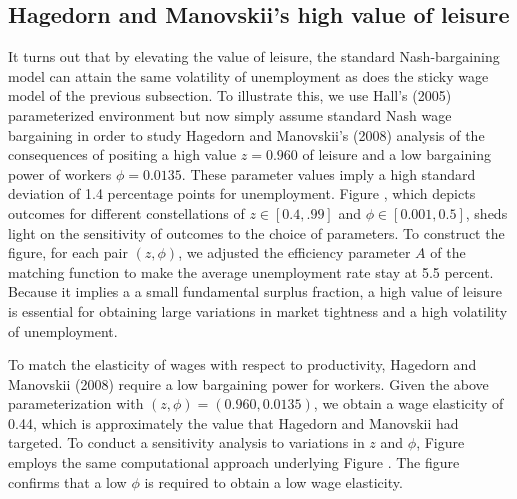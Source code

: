 \subsection{Hagedorn and Manovskii's high value of leisure}
           \label{sec:FS_HagMan_simul}%
 It turns out that  by elevating the value of
leisure,
the standard Nash-bargaining model can attain the
same volatility of unemployment as does the sticky wage model of the previous subsection.
To illustrate this, we use  Hall's (2005) parameterized environment
but
now simply assume standard Nash wage bargaining in order to study
 Hagedorn and Manovskii's (2008) analysis of the consequences of
  positing a high value $z=0.960$ of leisure  and a low
bargaining power of workers  $\phi=0.0135$.
These parameter values imply a
high standard deviation of 1.4 percentage points for unemployment.
Figure , which depicts outcomes for different
constellations of $z\in [0.4, .99]$ and $\phi\in[0.001, 0.5]$, sheds light
 on the sensitivity of outcomes to  the choice of parameters.
To construct the figure, for each pair $(z,\phi)$, we adjusted the efficiency parameter $A$
of the matching function to make the average unemployment rate stay at
5.5 percent. Because it implies a
a small fundamental surplus fraction, a high value of leisure is essential for obtaining large variations in market tightness and a high volatility of unemployment.



To match the elasticity of wages with respect to productivity,
Hagedorn and Manovskii (2008) require a low bargaining power for workers.
Given the above parameterization with $(z,\phi)=(0.960, 0.0135)$,
we obtain a  wage elasticity
of 0.44, which  is approximately the value that
Hagedorn and Manovskii had targeted. To conduct a sensitivity analysis to variations in $z$ and $\phi$,
Figure 
employs   the same computational approach underlying Figure .
  The figure confirms
that  a low $\phi$ is required to obtain a low wage
elasticity.


